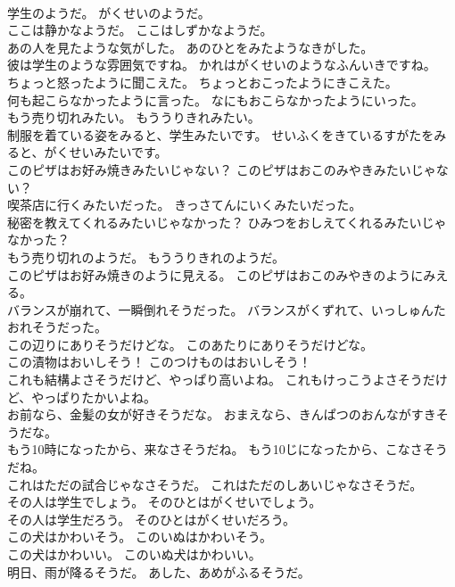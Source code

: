 \documentclass[8pt]{extreport}
\begin{document}
\begin{CJK}{UTF8}{min}
\\	学生のようだ。	がくせいのようだ。 
\\	ここは静かなようだ。	ここはしずかなようだ。 
\\	あの人を見たような気がした。	あのひとをみたようなきがした。 
\\	彼は学生のような雰囲気ですね。	かれはがくせいのようなふんいきですね。 
\\	ちょっと怒ったように聞こえた。	ちょっとおこったようにきこえた。 
\\	何も起こらなかったように言った。	なにもおこらなかったようにいった。 
\\	もう売り切れみたい。	もううりきれみたい。 
\\	制服を着ている姿をみると、学生みたいです。	せいふくをきているすがたをみると、がくせいみたいです。 
\\	このピザはお好み焼きみたいじゃない？	このピザはおこのみやきみたいじゃない？ 
\\	喫茶店に行くみたいだった。	きっさてんにいくみたいだった。 
\\	秘密を教えてくれるみたいじゃなかった？	ひみつをおしえてくれるみたいじゃなかった？ 
\\	もう売り切れのようだ。	もううりきれのようだ。 
\\	このピザはお好み焼きのように見える。	このピザはおこのみやきのようにみえる。 
\\	バランスが崩れて、一瞬倒れそうだった。	バランスがくずれて、いっしゅんたおれそうだった。 
\\	この辺りにありそうだけどな。	このあたりにありそうだけどな。 
\\	この漬物はおいしそう！	このつけものはおいしそう！ 
\\	これも結構よさそうだけど、やっぱり高いよね。	これもけっこうよさそうだけど、やっぱりたかいよね。 
\\	お前なら、金髪の女が好きそうだな。	おまえなら、きんぱつのおんながすきそうだな。 
\\	もう10時になったから、来なさそうだね。	もう10じになったから、こなさそうだね。 
\\	これはただの試合じゃなさそうだ。	これはただのしあいじゃなさそうだ。 
\\	その人は学生でしょう。	そのひとはがくせいでしょう。 
\\	その人は学生だろう。	そのひとはがくせいだろう。 
\\	この犬はかわいそう。	このいぬはかわいそう。 
\\	この犬はかわいい。	このいぬ犬はかわいい。 
\\	明日、雨が降るそうだ。	あした、あめがふるそうだ。 

\end{CJK}
\end{document}
